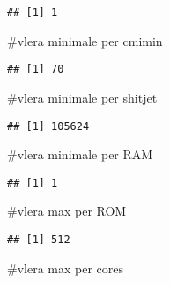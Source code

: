 \documentclass[
]{article}
\newenvironment{Shaded}{\begin{snugshade}}{\end{snugshade}}
\newcommand{\FunctionTok}[1]{\textcolor[rgb]{0.00,0.00,0.00}{#1}}
\newcommand{\NormalTok}[1]{#1}
\newcommand{\SpecialCharTok}[1]{\textcolor[rgb]{0.00,0.00,0.00}{#1}}
\begin{document}
\begin{verbatim}
## [1] 1
\end{verbatim}

\#vlera minimale per cmimin

\begin{Shaded}
\end{Shaded}

\begin{verbatim}
## [1] 70
\end{verbatim}

\#vlera minimale per shitjet

\begin{Shaded}
\end{Shaded}

\begin{verbatim}
## [1] 105624
\end{verbatim}

\#vlera minimale per RAM

\begin{Shaded}
\end{Shaded}

\begin{verbatim}
## [1] 1
\end{verbatim}

\#vlera max per ROM

\begin{Shaded}
\end{Shaded}

\begin{verbatim}
## [1] 512
\end{verbatim}

\#vlera max per cores

\begin{Shaded}
\end{Shaded}
\end{document}
